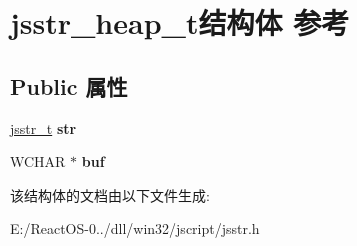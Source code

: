 \hypertarget{structjsstr__heap__t}{}\section{jsstr\+\_\+heap\+\_\+t结构体 参考}
\label{structjsstr__heap__t}
\subsection*{Public 属性}
\begin{DoxyCompactItemize}
\item 
\mbox{\label{structjsstr__heap__t_a4f68fca995fe89fb8e8f3dd470448370}} 
\hyperlink{struct__jsstr__t}{jsstr\+\_\+t} {\bfseries str}
\item 
\mbox{\label{structjsstr__heap__t_a7f3a21c5b3e2e803f7fd9307d68f9ce8}} 
W\+C\+H\+AR $\ast$ {\bfseries buf}
\end{DoxyCompactItemize}


该结构体的文档由以下文件生成\+:\begin{DoxyCompactItemize}
\item 
E\+:/\+React\+O\+S-\/0../dll/win32/jscript/jsstr.\+h\end{DoxyCompactItemize}
